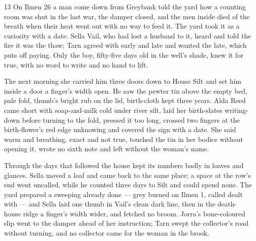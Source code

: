 





\CRtailpiece
\begin{CRchronicle}{13}
On Ilmen 26 a man come down from Greybank told the yard how a counting room was shut in the last war, the damper closed, and the men inside died of the breath when their heat went out with no way to feed it. The yard took it as a curiosity with a date. Sella Vail, who had lost a husband to it, heard and told the fire it was the thaw; Tarn agreed with early and late and wanted the late, which puts off paying. Only the boy, fifty-five days old in the well’s shade, knew it for true, with no word to write and no hand to lift.

The next morning she carried him three doors down to House Silt and set him inside a door a finger’s width open. He saw the pewter tin above the empty bed, pale fold, thumb’s bright rub on the lid, birth-cloth kept three years. Alda Reed came short with soap-and-milk cold under river silt, laid her birth-slates writing-down before turning to the fold, pressed it too long, crossed two fingers at the birth-flower’s red edge unknowing and covered the sign with a date. She said warm and breathing, exact and not true, touched the tin in her bodice without opening it, wrote no sixth note and left without the woman’s name.

Through the days that followed the house kept its numbers badly in loaves and glances. Sella moved a loaf and came back to the same place; a space at the row’s end went uncalled, while he counted three days to Silt and could spend none. The yard prepared a sweeping already done --- grey burned on Ilmen 1, called dealt with --- and Sella laid one thumb in Vail’s clean dark line, then in the death-house ridge a finger’s width wider, and fetched no broom. Jorra’s bone-coloured slip went to the damper ahead of her instruction; Tarn swept the collector’s road without turning, and no collector came for the woman in the brook.


\end{CRchronicle}
